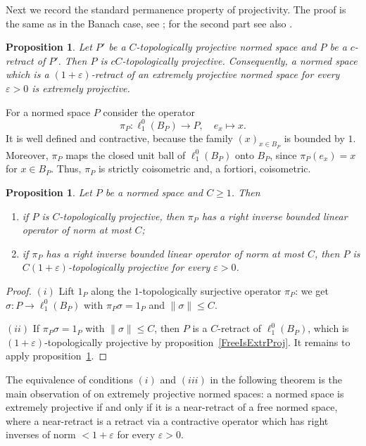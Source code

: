\documentclass[12pt]{article}
\newtheorem{proposition}[theorem]{Proposition}
\newcommand{\lo}[1]{\ell_1^0(#1)}
\newcommand{\norm}[1]{\lVert #1\rVert}
\begin{document}
Next we record the standard permanence property of projectivity. The proof
is the same as in the Banach case, see \cite[lemma 2.7]{WhiteInjmoduAlg};
for the second part see also
\cite[proposition 1.1]{HelExtrProjSeqAlg}.

\begin{proposition}\label{RetractOfProj} Let $P'$ be a $C$-topologically
    projective normed space and $P$ be a $c$-retract of $P'$. Then $P$ is
    $cC$-topologically projective. Consequently, a normed space which is a
    $(1+\varepsilon)$-retract of an extremely projective normed space for every
    $\varepsilon>0$ is extremely projective.
\end{proposition}

For a normed space $P$ consider the operator
\[
\pi_P:\lo{B_P}\to P,\quad e_x\mapsto x.
\]
It is well defined and contractive, because the family
${(x)}_{x\in B_P}$ is bounded by $1$. Moreover, $\pi_P$ maps the closed unit
ball of $\lo{B_P}$ onto $B_P$, since $\pi_P(e_x)=x$ for $x\in B_P$. Thus,
$\pi_P$ is strictly coisometric and, a fortiori, coisometric.

\begin{proposition}\label{CanonicalMorphismCriterion} Let $P$ be a normed
    space and $C\geq 1$. Then
    \begin{enumerate}[label = (\roman*)]
        \item if $P$ is $C$-topologically projective, then $\pi_P$ has a right
              inverse bounded linear operator of norm at most $C$;
        \item if $\pi_P$ has a right inverse bounded linear operator of norm at
              most $C$, then $P$ is $C(1+\varepsilon)$-topologically projective
              for every $\varepsilon>0$.
    \end{enumerate}
\end{proposition}
\begin{proof} $(i)$ Lift $1_P$ along the $1$-topologically surjective operator
    $\pi_P$: we get $\sigma:P\to\lo{B_P}$ with $\pi_P\sigma=1_P$ and
    $\norm{\sigma}\leq C$.

    $(ii)$ If $\pi_P\sigma=1_P$ with $\norm{\sigma}\leq C$, then $P$ is a
    $C$-retract of $\lo{B_P}$, which is $(1+\varepsilon)$-topologically
    projective by proposition~\ref{FreeIsExtrProj}. It remains to apply
    proposition~\ref{RetractOfProj}.
\end{proof}

The equivalence of conditions $(i)$ and $(iii)$ in the following theorem is
the main observation of \cite[section 2]{HelExtrProjSeqAlg} on extremely
projective normed spaces: a normed space is extremely projective if and only
if it is a near-retract of a free normed space, where a near-retract is a
retract via a contractive operator which has right inverses of norm
$<1+\varepsilon$ for every $\varepsilon>0$.
\end{document}
